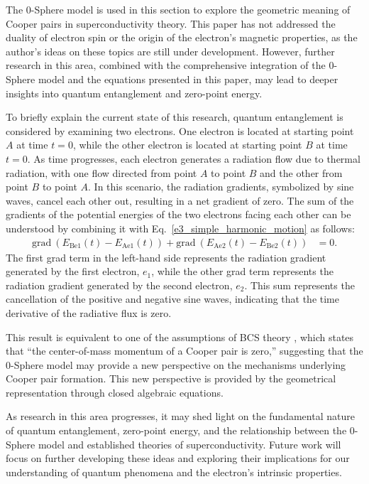 \documentclass[%
 reprint,
 amsmath,amssymb,
 aps,
]{revtex4-1}
\numberwithin{equation}{section}%
\begin{document}
The 0-Sphere model is used in this section to explore the geometric meaning of Cooper pairs in superconductivity theory. This paper has not addressed the duality of electron spin or the origin of the electron's magnetic properties, as the author's ideas on these topics are still under development. However, further research in this area, combined with the comprehensive integration of the 0-Sphere model and the equations presented in this paper, may lead to deeper insights into quantum entanglement and zero-point energy.

To briefly explain the current state of this research, quantum entanglement is considered by examining two electrons. One electron is located at starting point $A$ at time $t=0$, while the other electron is located at starting point $B$ at time $t=0$. As time progresses, each electron generates a radiation flow due to thermal radiation, with one flow directed from point $A$ to point $B$ and the other from point $B$ to point $A$. In this scenario, the radiation gradients, symbolized by sine waves, cancel each other out, resulting in a net gradient of zero.
The sum of the gradients of the potential energies of the two electrons facing each other can be understood by combining it with Eq.~\eqref{e3_simple_harmonic_motion} as follows:
\begin{align}
\mathrm{grad} \ (E_{\mathrm{Be1}}(t) - E_{\mathrm{Ae1}}(t)) + \mathrm{grad} \ (E_{\mathrm{Ae2}}(t) - E_{\mathrm{Be2}}(t))
&= 0.
\label{eq:BCS grad}
\end{align}
The first grad term in the left-hand side represents the radiation gradient generated by the first electron, $e_1$, while the other grad term represents the radiation gradient generated by the second electron, $e_2$. This sum represents the cancellation of the positive and negative sine waves, indicating that the time derivative of the radiative flux is zero.

This result is equivalent to one of the assumptions of BCS theory \cite{BCS1957}, which states that ``the center-of-mass momentum of a Cooper pair is zero,'' suggesting that the 0-Sphere model may provide a new perspective on the mechanisms underlying Cooper pair formation. This new perspective is provided by the geometrical representation through closed algebraic equations.

As research in this area progresses, it may shed light on the fundamental nature of quantum entanglement, zero-point energy, and the relationship between the 0-Sphere model and established theories of superconductivity. Future work will focus on further developing these ideas and exploring their implications for our understanding of quantum phenomena and the electron's intrinsic properties.
\end{document}
